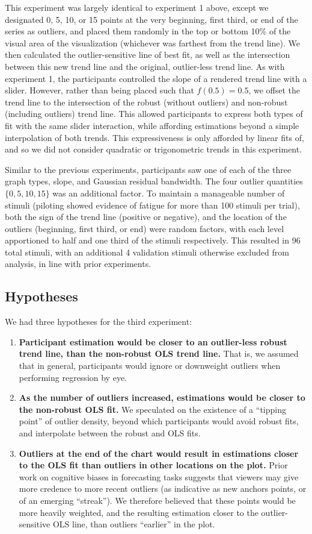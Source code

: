 \documentclass{sigchi}
\begin{document}
This experiment was largely identical to experiment 1 above, except we designated 0, 5, 10, or 15 points at the very beginning, first third, or end of the series as outliers, and placed them randomly in the top or bottom 10\% of the visual area of the visualization (whichever was farthest from the trend line). We then calculated the outlier-sensitive line of best fit, as well as the intersection between this new trend line and the original, outlier-less trend line. As with experiment 1, the participants controlled the slope of a rendered trend line with a slider. However, rather than being placed such that $f(0.5)=0.5$, we offset the trend line to the intersection of the robust (without outliers) and non-robust (including outliers) trend line. This allowed participants to express both types of fit with the same slider interaction, while affording estimations beyond a simple interpolation of both trends. This expressiveness is only afforded by linear fits of, and so we did not consider quadratic or trigonometric trends in this experiment.

Similar to the previous experiments, participants saw one of each of the three graph types, slope, and Gaussian residual bandwidth. The four outlier quantities $\{0,5,10,15\}$ was an additional factor. To maintain a manageable number of stimuli (piloting showed evidence of fatigue for more than 100 stimuli per trial), both the sign of the trend line (positive or negative), and the location of the outliers (beginning, first third, or end) were random factors, with each level apportioned to half and one third of the stimuli respectively. This resulted in 96 total stimuli, with an additional 4 validation stimuli otherwise excluded from analysis, in line with prior experiments.

\subsection{Hypotheses}

We had three hypotheses for the third experiment:
\begin{enumerate}
	\item \textbf{Participant estimation would be closer to an outlier-less robust trend line, than the non-robust OLS trend line.} That is, we assumed that in general, participants would ignore or downweight outliers when performing regression by eye.
	\item \textbf{As the number of outliers increased, estimations would be closer to the non-robust OLS fit.} We speculated on the existence of a ``tipping point'' of outlier density, beyond which participants would avoid robust fits, and interpolate between the robust and OLS fits.
	\item \textbf{Outliers at the end of the chart would result in estimations closer to the OLS fit than outliers in other locations on the plot.} Prior work on cognitive biases in forecasting tasks suggests that viewers may give more credence to more recent outliers (as indicative as new anchors points, or of an emerging ``streak''). We therefore believed that these points would be more heavily weighted, and the resulting estimation closer to the outlier-sensitive OLS line, than outliers ``earlier'' in the plot.
\end{enumerate}
\end{document}
